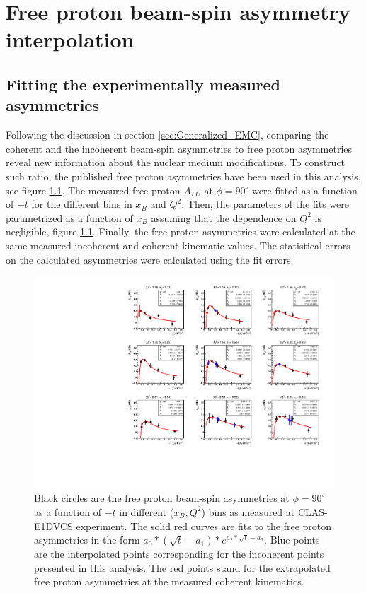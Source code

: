 \chapter{Free proton beam-spin asymmetry interpolation} 
\label{app:free-proton-alu}
\section{Fitting the experimentally measured asymmetries} \label{fit_int} 
Following the discussion in section \ref{sec:Generalized_EMC}, comparing the 
coherent and the incoherent beam-spin asymmetries to free proton asymmetries 
reveal new information about the nuclear medium modifications. To construct 
such ratio, the published free proton asymmetries \cite{FX_BSA} have been used 
in this analysis, see figure \ref{fig:free-proton-alu}. The measured free 
proton $A_{LU}$ at $\phi = 90^{\circ}$ were fitted as a function of $-t$ for 
the different bins in $x_B$ and $Q^2$. Then, the parameters of the fits were 
parametrized as a function of $x_B$ assuming that the dependence on $Q^2$ is 
negligible, figure \ref{fig:free-proton-alu}. Finally, the free proton 
asymmetries were calculated at the same measured incoherent and coherent
kinematic values.  The statistical errors on the calculated asymmetries were 
calculated using the fit errors.\\ 


\begin{figure}[tpb]
\centering
\includegraphics[scale=0.85]{fig_Dec2016/F_ALU-proton-fits.pdf}
\caption{Black circles are the free proton beam-spin asymmetries at $\phi = 90 
   ^{\circ}$ as a function of $-t$ in different ($x_B, Q^2$) bins as measured 
   at CLAS-E1DVCS experiment. The solid red curves are fits to the free proton 
   asymmetries in the form $a_{0}*(\sqrt{t}-a_{1})*e^{a_{2}*\sqrt{t} - a_{3}}$.
   Blue points are the interpolated points corresponding for the incoherent 
points presented in this analysis. The red points stand for the extrapolated 
free proton asymmetries at the measured coherent kinematics.}
\label{fig:free-proton-alu}
\end{figure}


